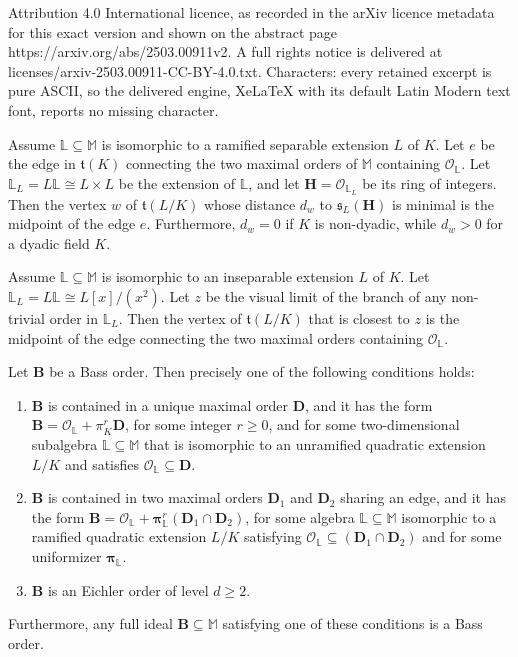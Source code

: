 \documentclass[10pt,a4paper]{amsart}
\newcommand\Ba{\mathbf B}
\newcommand\Da{\mathbf{D}}
\newcommand\Ha{\mathbf{H}}
\newcommand\alge{\mathbb{M}}
\newcommand\lu{\mathbb{L}}
\newcommand\oink{\mathcal O}
\begin{document}
Attribution 4.0 International licence, as recorded in the arXiv licence metadata for this exact version and shown on the abstract page https://arxiv.org/abs/2503.00911v2. A full rights notice is delivered at licenses/arxiv-2503.00911-CC-BY-4.0.txt. Characters: every retained excerpt is pure ASCII, so the delivered engine, XeLaTeX with its default Latin Modern text font, reports no missing character.
\begin{proposition}\label{p26}
    Assume $\lu\subseteq\alge $
    is isomorphic to a ramified
    separable extension $L$ of $K$.
    Let $e$ be the edge in $\mathfrak{t}(K)$
    connecting the two maximal orders of $\alge $
    containing $\oink_{\lu}$.
    Let $\lu_L=L\lu\cong L\times L$
    be the extension of $\lu$, and let 
    $\Ha=\oink_{\lu_L}$ be its ring of integers. 
    Then the vertex $w$ of $\mathfrak{t}(L/K)$ whose distance
    $d_w$ to $\mathfrak{s}_L(\Ha)$ is minimal
    is the midpoint of the edge $e$. 
    Furthermore, $d_w=0$ if $K$ is non-dyadic, while
    $d_w>0$ for a dyadic field $K$.
\end{proposition}

\begin{proposition}\label{p27}
    Assume $\lu\subseteq\alge $
    is isomorphic to an
    inseparable extension $L$ of $K$.
    Let $\lu_L=L\lu\cong L[x]/(x^2)$.
    Let $z$ be the visual limit of the branch of
    any non-trivial order in $\lu_L$. 
    Then the vertex of $\mathfrak{t}(L/K)$
    that is closest to $z$ is the midpoint of the edge
     connecting the two maximal orders containing 
    $\oink_{\lu}$. 
\end{proposition}

\begin{proposition}\label{p41n}
Let $\Ba$ be a Bass order. Then precisely one of the following
conditions holds:
\begin{enumerate}[label=($\mathfrak{E}$\bf{\arabic*})]
    \item\label{Ea1} $\Ba$ is contained in a unique maximal 
    order $\Da$, and it has the form 
    $\Ba=\mathcal{O}_{\lu}+\pi_K^r\Da$,
    for some integer $r\geq0$, and for some two-dimensional 
    subalgebra $\lu\subseteq\alge$ that is
    isomorphic to an unramified quadratic extension $L/K$
    and satisfies $\mathcal{O}_{\lu}\subseteq\Da$.
    \item\label{Ea2} $\Ba$ is contained in two maximal orders 
    $\Da_1$ and $\Da_2$ sharing an edge, and it has the form 
    $\Ba=\mathcal{O}_{\lu}+
    \boldsymbol\pi_{\lu}^r(\Da_1\cap\Da_2)$, 
    for some algebra $\lu\subseteq\alge$ isomorphic 
    to a ramified quadratic extension $L/K$ satisfying
    $\mathcal{O}_{\lu}\subseteq(\Da_1\cap\Da_2)$
    and for some 
    uniformizer $\boldsymbol\pi_{\lu}$.
    \item \label{Ea3} $\Ba$ is an Eichler order 
    of level $d\geq 2$.
\end{enumerate} 
Furthermore, any full ideal $\Ba\subseteq\alge$ satisfying one
of these conditions is a Bass order.
\end{proposition}
\end{document}
